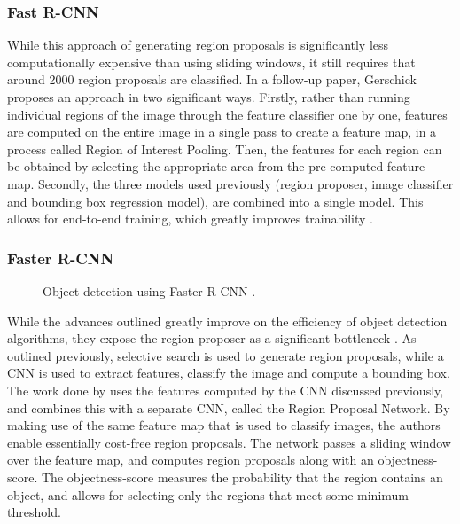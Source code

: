 \documentclass[\rootfolder/main.tex]{subfiles}
\begin{document}
\subsubsection{Fast R-CNN}

While this approach of generating region proposals is significantly less computationally expensive than using sliding windows, it still requires that around 2000 region proposals are classified.
In a follow-up paper, Gerschick proposes an approach in two significant ways.
Firstly, rather than running individual regions of the image through the feature classifier one by one, features are computed on the entire image in a single pass to create a feature map, in a process called Region of Interest Pooling.
Then, the features for each region can be obtained by selecting the appropriate area from the pre-computed feature map.
Secondly, the three models used previously (region proposer, image classifier and bounding box regression model), are combined into a single model.
This allows for end-to-end training, which greatly improves trainability \cite{Girshick2015}.

\subsubsection{Faster R-CNN}

\begin{wrapfigure}{r}{0.4\columnwidth}
    \caption{Object detection using Faster R-CNN \cite{Ren2017}.}
    \label{fig:faster-rcnn}
\end{wrapfigure}

While the advances outlined greatly improve on the efficiency of object detection algorithms, they expose the region proposer as a significant bottleneck \cite{Ren2017}.
As outlined previously, selective search is used to generate region proposals, while a CNN is used to extract features, classify the image and compute a bounding box.
The work done by \cite{Ren2017} uses the features computed by the CNN discussed previously, and combines this with a separate CNN, called the Region Proposal Network.
By making use of the same feature map that is used to classify images, the authors enable essentially cost-free region proposals.
The network passes a sliding window over the feature map, and computes region proposals along with an objectness-score.
The objectness-score measures the probability that the region contains an object, and allows for selecting only the regions that meet some minimum threshold.
\end{document}
